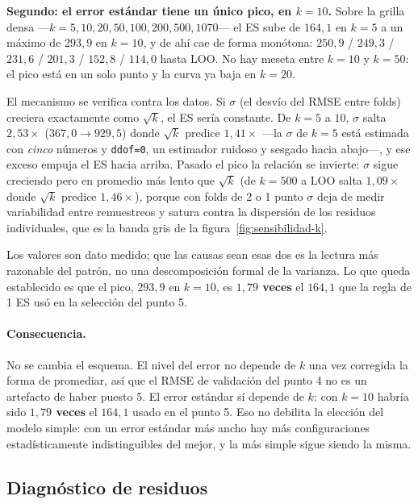 \documentclass[11pt,a4paper]{article}
\newcommand{\destacado}[1]{\textcolor{azulserie}{\textbf{#1}}}
\begin{document}
\textbf{Segundo: el error estándar tiene un único pico, en $k=10$.} Sobre la grilla densa
---$k=5,10,20,50,100,200,500,1070$--- el ES sube de $164{,}1$ en $k=5$ a un máximo de $293{,}9$
en $k=10$, y de ahí cae de forma monótona: $250{,}9$ / $249{,}3$ / $231{,}6$ / $201{,}3$ /
$152{,}8$ / $114{,}0$ hasta LOO. No hay meseta entre $k=10$ y $k=50$: el pico está en un solo
punto y la curva ya baja en $k=20$.

El mecanismo se verifica contra los datos. Si $\sigma$ (el desvío del RMSE entre folds)
creciera exactamente como $\sqrt{k}$, el ES sería constante. De $k=5$ a $10$, $\sigma$ salta
\destacado{$2{,}53\times$} ($367{,}0 \rightarrow 929{,}5$) donde $\sqrt{k}$ predice
$1{,}41\times$ ---la $\sigma$ de $k=5$ está estimada con \emph{cinco} números y
\texttt{ddof=0}, un estimador ruidoso y sesgado hacia abajo---, y ese exceso empuja el ES hacia
arriba. Pasado el pico la relación se invierte: $\sigma$ sigue creciendo pero en promedio más
lento que $\sqrt{k}$ (de $k=500$ a LOO salta $1{,}09\times$ donde $\sqrt{k}$ predice
$1{,}46\times$), porque con folds de 2 o 1 punto $\sigma$ deja de medir variabilidad entre
remuestreos y satura contra la dispersión de los residuos individuales, que es la banda gris de
la figura~\ref{fig:sensibilidad-k}.

Los valores son dato medido; que las causas sean esas dos es la lectura más razonable del
patrón, no una descomposición formal de la varianza. Lo que queda establecido es que el pico,
$293{,}9$ en $k=10$, es \destacado{$1{,}79$ veces} el $164{,}1$ que la regla de 1 ES usó en la
selección del punto 5.

\paragraph{Consecuencia.} No se cambia el esquema. El nivel del error no depende de $k$ una vez
corregida la forma de promediar, así que el RMSE de validación del punto 4 no es un artefacto
de haber puesto 5. El error estándar sí depende de $k$: con $k=10$ habría sido
\destacado{$1{,}79$ veces} el $164{,}1$ usado en el punto 5. Eso no debilita la elección del
modelo simple: con un error estándar más ancho hay más configuraciones estadísticamente
indistinguibles del mejor, y la más simple sigue siendo la misma.

\subsection{Diagnóstico de residuos}
\label{sec:diagnostico-residuos}
\end{document}
